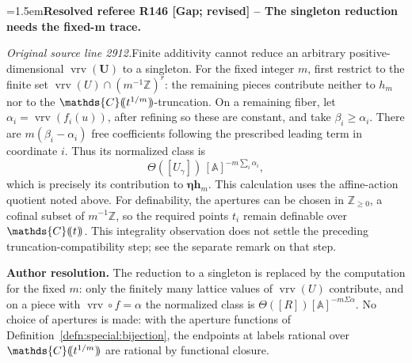 \documentclass[12pt]{amsart}
\newcommand{\ResolvedRefereeRemark}[5]{%
  \par\medskip\begingroup\normalfont\small\color{gray}%
  \emergencystretch=1.5em\noindent\textbf{Resolved referee R#1 [#2] -- #3.}\par\nobreak\noindent #4\par
  \medskip\color{ResolutionGreen}\noindent\textbf{Author resolution.} #5\par
  \endgroup\medskip
}
\theoremstyle{plain}
\theoremstyle{definition}
\theoremstyle{remark}
\numberwithin{equation}{section}
\theoremstyle{plain}
\newcommand{\Z}{\mathds{Z}}
\newcommand{\A}{\mathds{A}}
\newcommand{\C}{\mathds{C}}
\newcommand{\0}{\emptyset}
\newcommand{\dpar}[1]{%
   (\mkern-4mu (#1 )\mkern-4mu )}
\DeclareMathOperator{\vrv}{vrv}
\begin{document}
\ResolvedRefereeRemark{146}{Gap; revised}{The singleton reduction needs the fixed-m trace}{%
\textit{Original source line 2912.}\quad Finite additivity cannot reduce an arbitrary positive-dimensional $\vrv(\bm U)$ to a singleton. For the fixed integer $m$, first restrict to the finite set $\vrv(U)\cap(m^{-1}\Z)^r$: the remaining pieces contribute neither to $h_m$ nor to the $\C\dpar{t^{1/m}}$-truncation. On a remaining fiber, let $\alpha_i=\vrv(f_i(u))$, after refining so these are constant, and take $\beta_i\geq\alpha_i$. There are $m(\beta_i-\alpha_i)$ free coefficients following the prescribed leading term in coordinate $i$. Thus its normalized class is
\[
 \Theta([U_\gamma])\,[\A]^{-m\sum_i\alpha_i},
\]
which is precisely its contribution to $\bm\eta\bm h_m$. This calculation uses the affine-action quotient noted above. For definability, the apertures can be chosen in $\Z_{\geq0}$, a cofinal subset of $m^{-1}\Z$, so the required points $t_i$ remain definable over $\C\dpar t$. This integrality observation does not settle the preceding truncation-compatibility step; see the separate remark on that step.
}{The reduction to a singleton is replaced by the computation for the fixed $m$: only the finitely many lattice values of $\vrv(U)$ contribute, and on a piece with $\vrv\circ f=\alpha$ the normalized class is $\Theta([R])[\A]^{-m\Sigma\alpha}$. No choice of apertures is made: with the aperture functions of Definition~\ref{defn:special:bijection}, the endpoints at labels rational over $\C\dpar{t^{1/m}}$ are rational by functional closure.}
\end{document}
